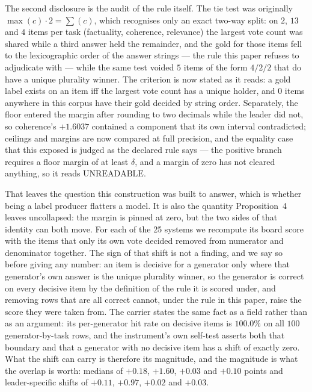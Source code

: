 \documentclass{article}
\begin{document}
The second disclosure is the audit of the rule itself. The tie test was originally $\max(c)\cdot 2 = \sum(c)$,
which recognises only an exact two-way split: on $2$, $13$ and $4$ items per task (factuality, coherence,
relevance) the largest vote count was shared while a third answer held the remainder, and the gold for those
items fell to the lexicographic order of the answer strings --- the rule this paper refuses to adjudicate with
--- while the same test voided $5$ items of the form $4/2/2$ that do have a unique plurality winner. The
criterion is now stated as it reads: a gold label exists on an item iff the largest vote count has a unique
holder, and $0$ items anywhere in this corpus have their gold decided by string order. Separately, the floor
entered the margin after rounding to two decimals while the leader did not, so coherence's $+1.6037$ contained a
component that its own interval contradicted; ceilings and margins are now compared at full precision, and the
equality case that this exposed is judged as the declared rule says --- the positive branch requires a floor margin of at least $\delta$, and a margin of zero has not cleared anything, so it reads $\mathrm{UNREADABLE}$.

That leaves the question this construction was built to answer, which is whether being a label producer flatters
a model. It is also the quantity Proposition~4 leaves uncollapsed: the margin is pinned at zero, but the two
sides of that identity can both move. For each of the 25 systems we recompute its board score
with the items that only its own vote decided removed from numerator and denominator together. The sign of that
shift is not a finding, and we say so before giving any number: an item is decisive for a generator only where
that generator's own answer is the unique plurality winner, so the generator is correct on every decisive item
by the definition of the rule it is scored under, and removing rows that are all correct cannot, under the rule in this paper, raise the score they were taken from. The carrier states the same fact as a field rather than as an argument: its per-generator
hit rate on decisive items is $100.0\%$ on all $100$ generator-by-task rows, and the instrument's own self-test
asserts both that boundary and that a generator with no decisive item has a shift of exactly zero. What the
shift can carry is therefore its magnitude, and the magnitude is what the overlap is worth:
medians of $+0.18$, $+1.60$, $+0.03$ and $+0.10$
points and leader-specific shifts of $+0.11$, $+0.97$, $+0.02$ and $+0.03$. 
\end{document}

